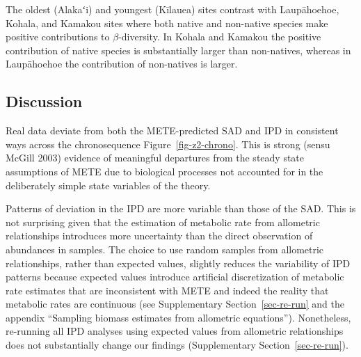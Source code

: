 \documentclass[
  letterpaper,
  DIV=11,
  numbers=noendperiod]{scrartcl}
\newcommand{\ssec}[1]{Supplementary Section~\ref{#1}}
\begin{document}
The oldest (Alakaʻi) and youngest (Kīlauea) sites contrast with
Laupāhoehoe, Kohala, and Kamakou sites where both native and non-native
species make positive contributions to \(\beta\)-diversity. In Kohala
and Kamakou the positive contribution of native species is substantially
larger than non-natives, whereas in Laupāhoehoe the contribution of
non-natives is larger.

\subsection{Discussion}\label{discussion}

Real data deviate from both the METE-predicted SAD and IPD in consistent
ways across the chronosequence Figure~\ref{fig-z2-chrono}. This is
strong (sensu McGill 2003) evidence of meaningful departures from the
steady state assumptions of METE due to biological processes not
accounted for in the deliberately simple state variables of the theory.

Patterns of deviation in the IPD are more variable than those of the
SAD. This is not surprising given that the estimation of metabolic rate
from allometric relationships introduces more uncertainty than the
direct observation of abundances in samples. The choice to use random
samples from allometric relationships, rather than expected values,
slightly reduces the variability of IPD patterns because expected values
introduce artificial discretization of metabolic rate estimates that are
inconsistent with METE and indeed the reality that metabolic rates are
continuous (see \ssec{sec-re-run} and the appendix ``Sampling biomass
estimates from allometric equations''). Nonetheless, re-running all IPD
analyses using expected values from allometric relationships does not
substantially change our findings (\ssec{sec-re-run}).
\end{document}
